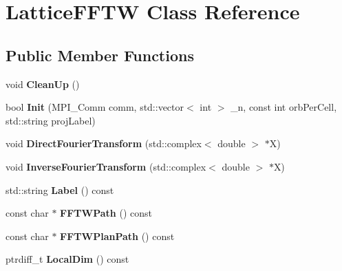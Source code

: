 \hypertarget{classLatticeFFTW}{}\section{Lattice\+F\+F\+TW Class Reference}
\label{classLatticeFFTW}
\subsection*{Public Member Functions}
\begin{DoxyCompactItemize}
\item 
void {\bfseries Clean\+Up} ()\hypertarget{classLatticeFFTW_a18d9c787f83cf849ce15901cd9d96748}{}\label{classLatticeFFTW_a18d9c787f83cf849ce15901cd9d96748}

\item 
bool {\bfseries Init} (M\+P\+I\+\_\+\+Comm comm, std\+::vector$<$ int $>$ \+\_\+n, const int orb\+Per\+Cell, std\+::string proj\+Label)\hypertarget{classLatticeFFTW_aee43e01359c222037ee36761969ce03d}{}\label{classLatticeFFTW_aee43e01359c222037ee36761969ce03d}

\item 
void {\bfseries Direct\+Fourier\+Transform} (std\+::complex$<$ double $>$ $\ast$X)\hypertarget{classLatticeFFTW_af8e62a55b741650695a3600bf5367f65}{}\label{classLatticeFFTW_af8e62a55b741650695a3600bf5367f65}

\item 
void {\bfseries Inverse\+Fourier\+Transform} (std\+::complex$<$ double $>$ $\ast$X)\hypertarget{classLatticeFFTW_ac46f222417bbf985ce66fd03f0de0ac9}{}\label{classLatticeFFTW_ac46f222417bbf985ce66fd03f0de0ac9}

\item 
std\+::string {\bfseries Label} () const \hypertarget{classLatticeFFTW_a0cbede6005be53058d6b3df5b8bd2ca9}{}\label{classLatticeFFTW_a0cbede6005be53058d6b3df5b8bd2ca9}

\item 
const char $\ast$ {\bfseries F\+F\+T\+W\+Path} () const \hypertarget{classLatticeFFTW_ae9da2b1655f34dc056db044fd0c384bc}{}\label{classLatticeFFTW_ae9da2b1655f34dc056db044fd0c384bc}

\item 
const char $\ast$ {\bfseries F\+F\+T\+W\+Plan\+Path} () const \hypertarget{classLatticeFFTW_a735fbea592f74b71f4b99b2cfe7f6e53}{}\label{classLatticeFFTW_a735fbea592f74b71f4b99b2cfe7f6e53}

\item 
ptrdiff\+\_\+t {\bfseries Local\+Dim} () const \hypertarget{classLatticeFFTW_a1e6d3a9f28193b8c1b7a3274c5b7fc44}{}\label{classLatticeFFTW_a1e6d3a9f28193b8c1b7a3274c5b7fc44}


\end{DoxyCompactItemize}
